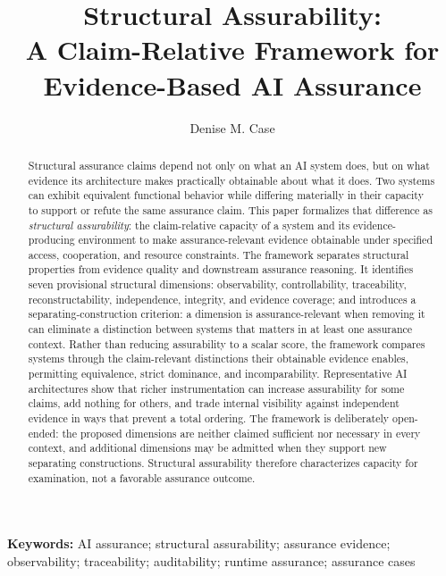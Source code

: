 \documentclass[11pt]{article}
\title{
Structural Assurability:\\
A Claim-Relative Framework for \\
Evidence-Based AI Assurance
}
\author{Denise M. Case}
\affil{\small School of Computer Science and Information Systems\\
Northwest Missouri State University, Maryville, MO, USA}
\date{}
\theoremstyle{plain}
\theoremstyle{definition}
\theoremstyle{remark}
\providecommand{\keywords}[1]{\vspace{0.5em}\noindent\textbf{Keywords: }\small #1}
\begin{document}
\maketitle
\vspace{-2em}

\begin{abstract}
  Structural assurance claims depend not only on what an AI system does,
  but on what evidence its architecture makes practically obtainable about what it does.
  Two systems can exhibit equivalent functional behavior while differing materially
  in their capacity to support or refute the same assurance claim.
  This paper formalizes that difference as \emph{structural assurability}:
  the claim-relative capacity of a system and its evidence-producing environment
  to make assurance-relevant evidence obtainable under specified
  access, cooperation, and resource constraints.
  The framework separates structural properties from evidence quality and
  downstream assurance reasoning.
  It identifies seven provisional structural dimensions:
  observability, controllability, traceability, reconstructability,
  independence, integrity, and evidence coverage;
  and introduces a separating-construction criterion:
  a dimension is assurance-relevant when
  removing it can eliminate a distinction between systems
  that matters in at least one assurance context.
  Rather than reducing assurability to a scalar score,
  the framework compares systems through the claim-relevant distinctions
  their obtainable evidence enables, permitting equivalence,
  strict dominance, and incomparability.
  Representative AI architectures show that richer instrumentation
  can increase assurability for some claims, add nothing for others,
  and trade internal visibility against independent evidence
  in ways that prevent a total ordering.
  The framework is deliberately open-ended:
  the proposed dimensions are neither claimed sufficient nor necessary in every context,
  and additional dimensions may be admitted when they support new separating constructions.
  Structural assurability therefore characterizes capacity for examination,
  not a favorable assurance outcome.
\end{abstract}


\keywords{
  AI assurance;
  structural assurability;
  assurance evidence;
  observability;
  traceability;
  auditability;
  runtime assurance;
  assurance cases
}











\end{document}
